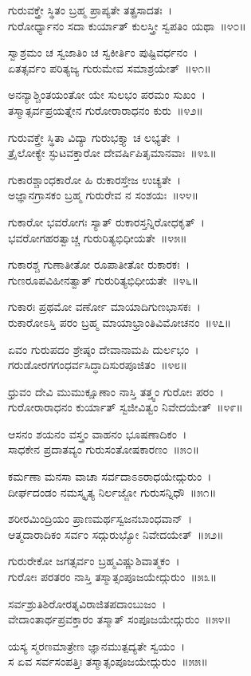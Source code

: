 ಗುರುವಕ್ತ್ರೇ ಸ್ಥಿತಂ ಬ್ರಹ್ಮ ಪ್ರಾಪ್ಯತೇ ತತ್ಪ್ರಸಾದತಃ~।\\
ಗುರೋರ್ಧ್ಯಾನಂ ಸದಾ ಕುರ್ಯಾತ್ ಕುಲಸ್ತ್ರೀ ಸ್ವಪತಿಂ ಯಥಾ~॥೪೦॥

ಸ್ವಾಶ್ರಮಂ ಚ ಸ್ವಜಾತಿಂ ಚ ಸ್ವಕೀರ್ತಿಂ ಪುಷ್ಟಿವರ್ಧನಂ~।\\
ಏತತ್ಸರ್ವಂ ಪರಿತ್ಯಜ್ಯ ಗುರುಮೇವ ಸಮಾಶ್ರಯೇತ್~॥೪೧॥

ಅನನ್ಯಾಶ್ಚಿಂತಯಂತೋ ಯೇ ಸುಲಭಂ ಪರಮಂ ಸುಖಂ~।\\
ತಸ್ಮಾತ್ಸರ್ವಪ್ರಯತ್ನೇನ ಗುರೋರಾರಾಧನಂ ಕುರು~॥೪೨॥

ಗುರುವಕ್ತ್ರೇ ಸ್ಥಿತಾ ವಿದ್ಯಾ ಗುರುಭಕ್ತ್ಯಾ ಚ ಲಭ್ಯತೇ~।\\
ತ್ರೈಲೋಕ್ಯೇ ಸ್ಫುಟವಕ್ತಾರೋ ದೇವರ್ಷಿಪಿತೃಮಾನವಾಃ~॥೪೩॥

ಗುಕಾರಶ್ಚಾಂಧಕಾರೋ ಹಿ ರುಕಾರಸ್ತೇಜ ಉಚ್ಯತೇ~।\\
ಅಜ್ಞಾನಗ್ರಾಸಕಂ ಬ್ರಹ್ಮ ಗುರುರೇವ ನ ಸಂಶಯಃ~॥೪೪॥

ಗುಕಾರೋ ಭವರೋಗಃ ಸ್ಯಾತ್ ರುಕಾರಸ್ತನ್ನಿರೋಧಕೃತ್~।\\
ಭವರೋಗಹರತ್ವಾಚ್ಚ ಗುರುರಿತ್ಯಭಿಧೀಯತೇ~॥೪೫॥

ಗುಕಾರಶ್ಚ ಗುಣಾತೀತೋ ರೂಪಾತೀತೋ ರುಕಾರಕಃ~।\\
ಗುಣರೂಪವಿಹೀನತ್ವಾತ್ ಗುರುರಿತ್ಯಭಿಧೀಯತೇ~॥೪೬॥

ಗುಕಾರಃ ಪ್ರಥಮೋ ವರ್ಣೋ ಮಾಯಾದಿಗುಣಭಾಸಕಃ~।\\
ರುಕಾರೋಽಸ್ತಿ ಪರಂ ಬ್ರಹ್ಮ ಮಾಯಾಭ್ರಾಂತಿವಿಮೋಚನಂ~॥೪೭॥

ಏವಂ ಗುರುಪದಂ ಶ್ರೇಷ್ಠಂ ದೇವಾನಾಮಪಿ ದುರ್ಲಭಂ~।\\
ಗರುಡೋರಗಗಂಧರ್ವಸಿದ್ಧಾದಿಸುರಪೂಜಿತಂ~॥೪೮॥

ಧ್ರುವಂ ದೇವಿ ಮುಮುಕ್ಷೂಣಾಂ ನಾಸ್ತಿ ತತ್ತ್ವಂ ಗುರೋಃ ಪರಂ~।\\
ಗುರೋರಾರಾಧನಂ ಕುರ್ಯಾತ್ ಸ್ವಜೀವಿತ್ವಂ ನಿವೇದಯೇತ್~॥೪೯॥

ಆಸನಂ ಶಯನಂ ವಸ್ತ್ರಂ ವಾಹನಂ ಭೂಷಣಾದಿಕಂ~।\\
ಸಾಧಕೇನ ಪ್ರದಾತವ್ಯಂ ಗುರುಸಂತೋಷಕಾರಣಂ~॥೫೦॥

ಕರ್ಮಣಾ ಮನಸಾ ವಾಚಾ ಸರ್ವದಾಽಽರಾಧಯೇದ್ಗುರುಂ~।\\
ದೀರ್ಘದಂಡಂ ನಮಸ್ಕೃತ್ಯ ನಿರ್ಲಜ್ಜೋ ಗುರುಸನ್ನಿಧೌ~॥೫೧॥

ಶರೀರಮಿಂದ್ರಿಯಂ ಪ್ರಾಣಮರ್ಥಸ್ವಜನಬಾಂಧವಾನ್~।\\
ಆತ್ಮದಾರಾದಿಕಂ ಸರ್ವಂ ಸದ್ಗುರುಭ್ಯೋ ನಿವೇದಯೇತ್~॥೫೨॥

ಗುರುರೇಕೋ ಜಗತ್ಸರ್ವಂ ಬ್ರಹ್ಮವಿಷ್ಣುಶಿವಾತ್ಮಕಂ~।\\
ಗುರೋಃ ಪರತರಂ ನಾಸ್ತಿ ತಸ್ಮಾತ್ಸಂಪೂಜಯೇದ್ಗುರುಂ~॥೫೩॥

ಸರ್ವಶ್ರುತಿಶಿರೋರತ್ನವಿರಾಜಿತಪದಾಂಬುಜಂ~।\\
ವೇದಾಂತಾರ್ಥಪ್ರವಕ್ತಾರಂ ತಸ್ಮಾತ್ ಸಂಪೂಜಯೇದ್ಗುರುಂ~॥೫೪॥

ಯಸ್ಯ ಸ್ಮರಣಮಾತ್ರೇಣ ಜ್ಞಾನಮುತ್ಪದ್ಯತೇ ಸ್ವಯಂ~।\\
ಸ ಏವ ಸರ್ವಸಂಪತ್ತಿಃ ತಸ್ಮಾತ್ಸಂಪೂಜಯೇದ್ಗುರುಂ~॥೫೫॥

